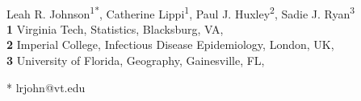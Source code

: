 \documentclass[
  11pt,
  letterpaper,
]{article}
\begin{document}
\vspace*{0.2in}

\begin{flushleft}
{\Large
\textbf{} %
}
\newline
\\
Leah R. Johnson\textsuperscript{1*}, Catherine
Lippi\textsuperscript{1}, Paul J. Huxley\textsuperscript{2}, Sadie J.
Ryan\textsuperscript{3}
\\
\bigskip
\textbf{1} Virginia
Tech, Statistics, Blacksburg, VA, \\ \textbf{2} Imperial
College, Infectious Disease
Epidemiology, London, UK, \\ \textbf{3} University of
Florida, Geography, Gainesville, FL, 
\bigskip

% 
%





* lrjohn@vt.edu

\end{flushleft}
\end{document}

